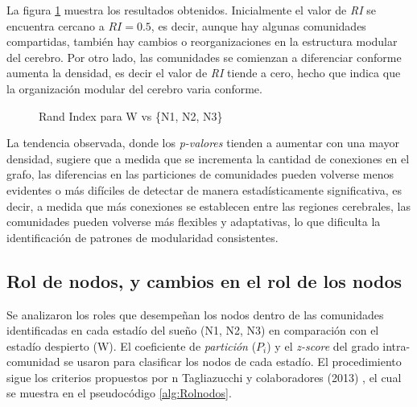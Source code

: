 \documentclass{article}
\begin{document}
La figura \ref{fig:RI_Alexander} muestra los resultados obtenidos. Inicialmente el valor de \textit{RI} se encuentra cercano a $RI=0.5$, es decir, aunque hay algunas comunidades compartidas, también hay cambios o reorganizaciones en la estructura modular del cerebro. Por otro lado, las comunidades se comienzan a diferenciar conforme aumenta la densidad, es decir el valor de \textit{RI} tiende a cero, hecho que indica que la organización modular del cerebro varia conforme.

\begin{figure}[H]
    \centering
    \hfill
    \hfill
    \hfill
    \caption[]{Rand Index para W vs \{N1, N2, N3\}\footnotemark}
    \label{fig:RI_Alexander}
\end{figure}

La tendencia observada, donde los \textit{p-valores} tienden a aumentar con una mayor densidad, sugiere que a medida que se incrementa la cantidad de conexiones en el grafo, las diferencias en las particiones de comunidades pueden volverse menos evidentes o más difíciles de detectar de manera estadísticamente significativa, es decir, a medida que más conexiones se establecen entre las regiones cerebrales, las comunidades pueden volverse más flexibles y adaptativas, lo que dificulta la identificación de patrones de modularidad consistentes.

\subsection{Rol de nodos, y cambios en el rol de los
nodos}

Se analizaron los roles que desempeñan los nodos dentro de las comunidades identificadas en cada estadío del sueño (N1, N2, N3) en comparación con el estadío despierto (W). El coeficiente de \textit{partición} ($P_i$) y el \textit{z-score} del grado intra-comunidad se usaron para clasificar los nodos de cada estadío. El procedimiento sigue los criterios propuestos por n Tagliazucchi y colaboradores (2013) \cite{Tagliazucchi:2013aa}, el cual se muestra en el pseudocódigo \ref{alg:Rolnodos}.
\end{document}
